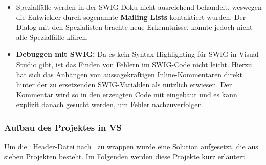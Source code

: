 \begin{itemize}
\begin{itemize}
	\end{itemize}
\item Spezialfälle werden in der SWIG-Doku nicht ausreichend behandelt, weswegen die Entwickler durch sogenannte \textbf{Mailing Lists} kontaktiert wurden. Der Dialog mit den Spezialisten brachte neue Erkenntnisse, konnte jedoch nicht alle Spezialfälle klären. %
\item \textbf{Debuggen mit SWIG:} Da es kein Syntax-Highlighting für SWIG in Visual Studio gibt, ist das Finden von Fehlern im SWIG-Code nicht leicht. Hierzu hat sich das Anhängen von aussagekräftigen Inline-Kommentaren direkt hinter der zu ersetzenden SWIG-Variablen als nützlich erwiesen. Der Kommentar wird so in den erzeugten Code mit eingebaut und es kann explizit danach gesucht werden, um Fehler nachzuverfolgen.
\end{itemize}

\subsubsection{Aufbau des Projektes in VS}\label{subsubsec:Aufbau}

Um die \CC~Header-Datei nach \CS~zu wrappen wurde eine Solution aufgesetzt, die aus sieben Projekten besteht. Im Folgenden werden diese Projekte kurz erläutert.\\

